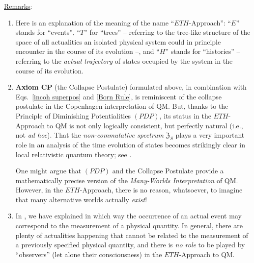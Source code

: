 \documentclass[a4paper,11pt]{article}
\begin{document}
\underline{Remarks}:
\begin{enumerate}
\item{Here is an explanation of the meaning of the name ``$ETH$-Approach'': ``$E$'' stands for ``events'', 
``$T$'' for ``trees'' -- referring to the tree-like structure of the space of all actualities an isolated physical system 
could in principle encounter in the course of its evolution --, and ``$H$'' stands for ``histories'' -- 
referring to the \textit{actual trajectory} of states occupied by the system in the course of its evolution.}
\item{{\bf{Axiom CP}} (the Collapse Postulate) formulated above, in combination with Eqs.~\eqref{incoh superpos} 
and \eqref{Born Rule}, is reminiscent of the collapse postulate in the Copenhagen interpretation of QM. But, thanks to the 
Principle of Diminishing Potentialities $(PDP)$, its status in the $ETH$-Approach to QM is not only logically consistent, but perfectly natural (i.e., not \textit{ad hoc}). That the \textit{non-commutative spectrum} $\mathfrak{Z}_S$ plays a very important role in an analysis of the time evolution of states becomes strikingly clear in local relativistic quantum theory; see \cite{Fr2}.

One might argue that  $(PDP)$ and the Collapse Postulate provide a mathematically precise version of the 
\textit{Many-Worlds Interpretation} of QM. However, in the $ETH$-Approach, there is no reason, whatsoever, to 
imagine that many alternative worlds actually \textit{exist}!}
\item{In \cite{Fr1, Fr2}, we have explained in which way the occurrence of an actual event may correspond 
to the measurement of a physical quantity. In general, there are plenty of actualities happening that cannot be related 
to the measurement of a previously specified physical quantity, and there is \textit{no role} to be played by ``observers'' (let alone their consciousness) in the 
$ETH$-Approach to QM.

}
\end{enumerate}
\end{document}
